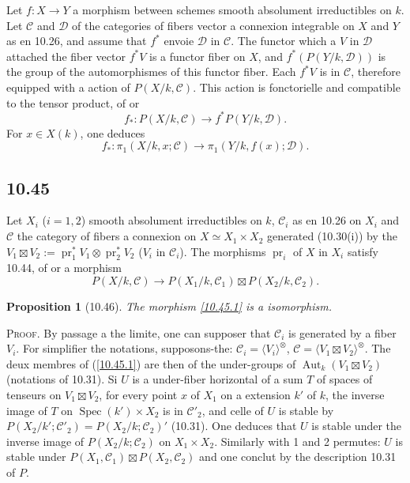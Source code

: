 \documentclass[12pt,a4paper]{article}
\theoremstyle{plain}
\newtheorem{proposition}[theorem]{Proposition}
\theoremstyle{definition}
\theoremstyle{remark}
\DeclareMathOperator{\Spec}{Spec}
\DeclareMathOperator{\Aut}{Aut}
\DeclareMathOperator{\pr}{pr}
\begin{document}
Let $f: X \to Y$ a morphism between schemes smooth absolument irreductibles on $k$. Let $\mathcal{C}$ and $\mathcal{D}$ of the categories of fibers vector a connexion integrable on $X$ and $Y$ as en 10.26, and assume that $f^*$ envoie $\mathcal{D}$ in $\mathcal{C}$. The functor which a $V$ in $\mathcal{D}$ attached the fiber vector $f^* V$ is a functor fiber on $X$, and $f^*(P(Y/k, \mathcal{D}))$ is the group of the automorphismes of this functor fiber. Each $f^* V$ is in $\mathcal{C}$, therefore equipped with a action of $P(X/k, \mathcal{C})$. This action is fonctorielle and compatible to the tensor product, of or
\begin{equation}\label{10.44.1}
f_*: P(X/k, \mathcal{C}) \longrightarrow f^* P(Y/k, \mathcal{D}). \tag{10.44.1}
\end{equation}
For $x \in X(k)$, one deduces
\begin{equation}\label{10.44.2}
f_*: \pi_1(X/k, x; \mathcal{C}) \longrightarrow \pi_1(Y/k, f(x); \mathcal{D}). \tag{10.44.2}
\end{equation}

\subsection*{10.45}

Let $X_i$ ($i = 1, 2$) smooth absolument irreductibles on $k$, $\mathcal{C}_i$ as en 10.26 on $X_i$ and $\mathcal{C}$ the category of fibers a connexion on $X \simeq X_1 \times X_2$ generated (10.30(i)) by the $V_1 \boxtimes V_2 := \pr_1^* V_1 \otimes \pr_2^* V_2$ ($V_i$ in $\mathcal{C}_i$). The morphisms $\pr_i$ of $X$ in $X_i$ satisfy 10.44, of or a morphism
\begin{equation}\label{10.45.1}
P(X/k, \mathcal{C}) \longrightarrow P(X_1/k, \mathcal{C}_1) \boxtimes P(X_2/k, \mathcal{C}_2). \tag{10.45.1}
\end{equation}

\begin{proposition}[10.46]
The morphism \ref{10.45.1} is a isomorphism.
\end{proposition}

\textsc{Proof.} By passage a the limite, one can supposer that $\mathcal{C}_i$ is generated by a fiber $V_i$. For simplifier the notations, supposons-the: $\mathcal{C}_i = \langle V_i \rangle^{\otimes}$, $\mathcal{C} = \langle V_1 \boxtimes V_2 \rangle^{\otimes}$. The deux membres of (\ref{10.45.1}) are then of the under-groups of $\Aut_k(V_1 \boxtimes V_2)$ (notations of 10.31). Si $U$ is a under-fiber horizontal of a sum $T$ of spaces of tenseurs on $V_1 \boxtimes V_2$, for every point $x$ of $X_1$ on a extension $k'$ of $k$, the inverse image of $T$ on $\Spec(k') \times X_2$ is in $\mathcal{C}'_2$, and celle of $U$ is stable by $P(X_2/k'; \mathcal{C}'_2) = P(X_2/k; \mathcal{C}_2)'$ (10.31). One deduces that $U$ is stable under the inverse image of $P(X_2/k; \mathcal{C}_2)$ on $X_1 \times X_2$. Similarly with 1 and 2 permutes: $U$ is stable under $P(X_1, \mathcal{C}_1) \boxtimes P(X_2, \mathcal{C}_2)$ and one conclut by the description 10.31 of $P$.
\end{document}
